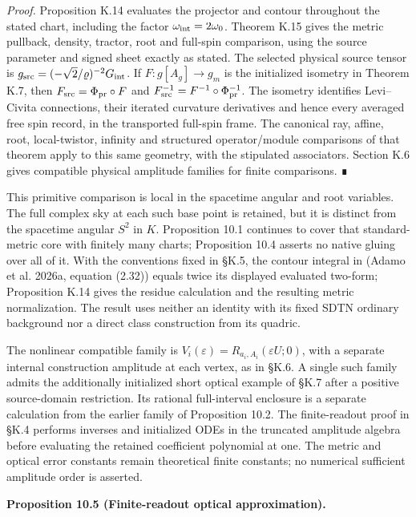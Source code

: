 \documentclass[
  english,
  11pt,
  reqno]{amsart}
\makeatletter
\newcommand{\pandocstatementheading}[1]{%
  \par\addpenalty{\@beginparpenalty}%
  \addvspace{.5\baselineskip plus .2\baselineskip minus .2\baselineskip}%
  {\normalfont\bfseries #1\par}%
  \nobreak\@afterindenttrue\@afterheading
}
\makeatother
\begin{document}
\emph{Proof.} Proposition K.14 evaluates the projector and contour
throughout the stated chart, including the factor
\(\omega_{\rm int}=2\omega_0\). Theorem K.15 gives the metric pullback,
density, tractor, root and full-spin comparison, using the source
parameter and signed sheet exactly as stated. The selected physical
source tensor is \(g_{\rm src}=(-\sqrt2/\varrho)^{-2}G_{\rm int}\). If
\(F:g[A_g]\to g_m\) is the initialized isometry in Theorem K.7, then
\(F_{\rm src}=\Phi_{\rm pr}\circ F\) and
\(F_{\rm src}^{-1}=F^{-1}\circ\Phi_{\rm pr}^{-1}\). The isometry
identifies Levi--Civita connections, their iterated curvature
derivatives and hence every averaged free spin record, in the
transported full-spin frame. The canonical ray, affine, root,
local-twistor, infinity and structured operator/module comparisons of
that theorem apply to this same geometry, with the stipulated
associators. Section K.6 gives compatible physical amplitude families
for finite comparisons. ∎

This primitive comparison is local in the spacetime angular and root
variables. The full complex sky at each such base point is retained, but
it is distinct from the spacetime angular \(S^2\) in \(K\). Proposition
10.1 continues to cover that standard-metric core with finitely many
charts; Proposition 10.4 asserts no native gluing over all of it. With
the conventions fixed in §K.5, the contour integral in (Adamo et al.
2026a, equation (2.32)) equals twice its displayed evaluated two-form;
Proposition K.14 gives the residue calculation and the resulting metric
normalization. The result uses neither an identity with its fixed SDTN
ordinary background nor a direct class construction from its quadric.

The nonlinear compatible family is
\(V_i(\varepsilon)=R_{a_i,A_i}(\varepsilon U;0)\), with a separate
internal construction amplitude at each vertex, as in §K.6. A single
such family admits the additionally initialized short optical example of
§K.7 after a positive source-domain restriction. Its rational
full-interval enclosure is a separate calculation from the earlier
family of Proposition 10.2. The finite-readout proof in §K.4 performs
inverses and initialized ODEs in the truncated amplitude algebra before
evaluating the retained coefficient polynomial at one. The metric and
optical error constants remain theoretical finite constants; no
numerical sufficient amplitude order is asserted.

\pandocstatementheading{\protect{}\label{prop:gg-schwarzschild-finite-readout}Proposition 10.5 (Finite-readout optical approximation).}
\end{document}
